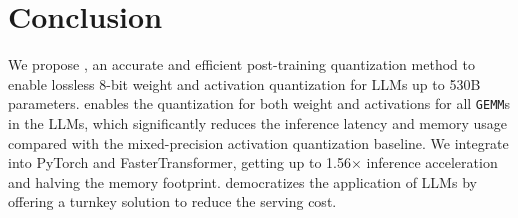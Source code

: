 \section{Conclusion}
We propose \method, an accurate and efficient post-training quantization method to enable lossless 8-bit weight and activation quantization for LLMs up to 530B parameters.
\method enables the quantization for both weight and activations for all \texttt{GEMM}s in the LLMs, which significantly reduces the inference latency and memory usage compared with the mixed-precision activation quantization baseline. We integrate \method into PyTorch and FasterTransformer, getting up to 1.56$\times$ inference acceleration and halving the memory footprint. 
\method democratizes the application of LLMs by offering a turnkey solution to reduce the serving cost. 
